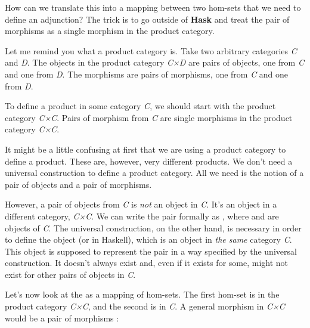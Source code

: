 How can we translate this into a mapping between two hom-sets that we
need to define an adjunction? The trick is to go outside of
\textbf{Hask} and treat the pair of morphisms as a single morphism in
the product category.

Let me remind you what a product category is. Take two arbitrary
categories \emph{C} and \emph{D}. The objects in the product category
\emph{C×D} are pairs of objects, one from \emph{C} and one from
\emph{D}. The morphisms are pairs of morphisms, one from \emph{C} and
one from \emph{D}.

To define a product in some category \emph{C}, we should start with the
product category \emph{C×C}. Pairs of morphism from \emph{C} are single
morphisms in the product category \emph{C×C}.

\begin{figure}[H]
\centering
{}
\end{figure}

\noindent
It might be a little confusing at first that we are using a product
category to define a product. These are, however, very different
products. We don't need a universal construction to define a product
category. All we need is the notion of a pair of objects and a pair of
morphisms.

However, a pair of objects from \emph{C} is \emph{not} an object in
\emph{C}. It's an object in a different category, \emph{C×C}. We can
write the pair formally as ,
where  and  are objects of \emph{C}. The universal
construction, on the other hand, is necessary in order to define the
object  (or  in Haskell), which is an object
in \emph{the same} category \emph{C}. This object is supposed to
represent the pair  in a way
specified by the universal construction. It doesn't always exist and,
even if it exists for some, might not exist for other pairs of objects
in \emph{C}.

Let's now look at the  as a mapping of hom-sets. The
first hom-set is in the product category \emph{C×C}, and the second is
in \emph{C}. A general morphism in \emph{C×C} would be a pair of
morphisms :

